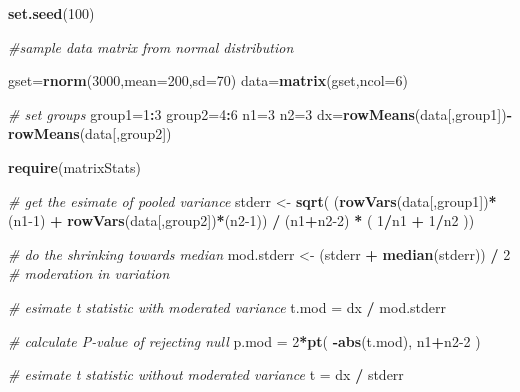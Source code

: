 \documentclass[12pt,]{krantz}
\newenvironment{Shaded}{\begin{snugshade}}{\end{snugshade}}
\newcommand{\CommentTok}[1]{\textcolor[rgb]{0.56,0.35,0.01}{\textit{#1}}}
\newcommand{\DataTypeTok}[1]{\textcolor[rgb]{0.13,0.29,0.53}{#1}}
\newcommand{\DecValTok}[1]{\textcolor[rgb]{0.00,0.00,0.81}{#1}}
\newcommand{\KeywordTok}[1]{\textcolor[rgb]{0.13,0.29,0.53}{\textbf{#1}}}
\newcommand{\NormalTok}[1]{#1}
\newcommand{\OperatorTok}[1]{\textcolor[rgb]{0.81,0.36,0.00}{\textbf{#1}}}
\newcommand{\StringTok}[1]{\textcolor[rgb]{0.31,0.60,0.02}{#1}}
\begin{document}
\begin{Shaded}
\begin{Highlighting}[]
\KeywordTok{set.seed}\NormalTok{(}\DecValTok{100}\NormalTok{)}

\CommentTok{#sample data matrix from normal distribution}

\NormalTok{gset=}\KeywordTok{rnorm}\NormalTok{(}\DecValTok{3000}\NormalTok{,}\DataTypeTok{mean=}\DecValTok{200}\NormalTok{,}\DataTypeTok{sd=}\DecValTok{70}\NormalTok{)}
\NormalTok{data=}\KeywordTok{matrix}\NormalTok{(gset,}\DataTypeTok{ncol=}\DecValTok{6}\NormalTok{)}

\CommentTok{# set groups}
\NormalTok{group1=}\DecValTok{1}\OperatorTok{:}\DecValTok{3}
\NormalTok{group2=}\DecValTok{4}\OperatorTok{:}\DecValTok{6}
\NormalTok{n1=}\DecValTok{3}
\NormalTok{n2=}\DecValTok{3}
\NormalTok{dx=}\KeywordTok{rowMeans}\NormalTok{(data[,group1])}\OperatorTok{-}\KeywordTok{rowMeans}\NormalTok{(data[,group2])}
  
\KeywordTok{require}\NormalTok{(matrixStats)}

\CommentTok{# get the esimate of pooled variance }
\NormalTok{stderr <-}\StringTok{ }\KeywordTok{sqrt}\NormalTok{( (}\KeywordTok{rowVars}\NormalTok{(data[,group1])}\OperatorTok{*}\NormalTok{(n1}\DecValTok{-1}\NormalTok{) }\OperatorTok{+}\StringTok{ }\KeywordTok{rowVars}\NormalTok{(data[,group2])}\OperatorTok{*}\NormalTok{(n2}\DecValTok{-1}\NormalTok{)) }\OperatorTok{/}\StringTok{ }\NormalTok{(n1}\OperatorTok{+}\NormalTok{n2}\DecValTok{-2}\NormalTok{) }\OperatorTok{*}\StringTok{ }\NormalTok{( }\DecValTok{1}\OperatorTok{/}\NormalTok{n1 }\OperatorTok{+}\StringTok{ }\DecValTok{1}\OperatorTok{/}\NormalTok{n2 ))}

\CommentTok{# do the shrinking towards median}
\NormalTok{mod.stderr <-}\StringTok{ }\NormalTok{(stderr }\OperatorTok{+}\StringTok{ }\KeywordTok{median}\NormalTok{(stderr)) }\OperatorTok{/}\StringTok{ }\DecValTok{2} \CommentTok{# moderation in variation}

\CommentTok{# esimate t statistic with moderated variance}
\NormalTok{t.mod =}\StringTok{ }\NormalTok{dx }\OperatorTok{/}\StringTok{ }\NormalTok{mod.stderr}

\CommentTok{# calculate P-value of rejecting null }
\NormalTok{p.mod =}\StringTok{ }\DecValTok{2}\OperatorTok{*}\KeywordTok{pt}\NormalTok{( }\OperatorTok{-}\KeywordTok{abs}\NormalTok{(t.mod), n1}\OperatorTok{+}\NormalTok{n2}\DecValTok{-2}\NormalTok{ )}

\CommentTok{# esimate t statistic without moderated variance}
\NormalTok{t =}\StringTok{ }\NormalTok{dx }\OperatorTok{/}\StringTok{ }\NormalTok{stderr}


\end{Highlighting}
\end{Shaded}
\end{document}
